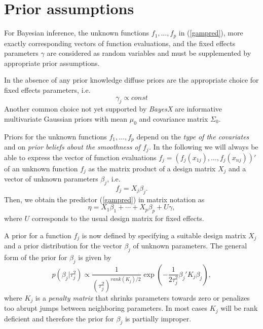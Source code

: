 \documentclass[11pt,a4paper,twoside]{bayesxarticle}
\begin{document}
\section{Prior assumptions}
\label{priorassumptions}

For Bayesian inference, the unknown functions $f_{1},\dots ,f_{p}$
in (\ref{gampred}), more exactly corresponding vectors of function
evaluations, and the fixed effects parameters $\gamma$ are
considered as random variables and must be supplemented by
appropriate prior assumptions.

In the absence of any prior knowledge diffuse priors are the
appropriate choice for fixed effects parameters, i.e.
$$
\gamma_j \propto const
$$
Another common choice not yet supported by {\em BayesX} are
informative multivariate Gaussian priors with mean $\mu_0$ and
covariance matrix $\Sigma_0$.


Priors for the unknown functions $f_{1},\dots,f_{p}$ depend on the
{\em type of the covariates} and on {\em prior beliefs about the
smoothness of $f_j$.} In the following we will always be able to
express the vector of function evaluations
$f_j=(f_j(x_{1j}),\dots,f_j(x_{nj}))'$ of an unknown function
$f_j$ as the matrix product of a design matrix $X_j$ and a vector
of unknown parameters $\beta_j$, i.e.
\begin{equation}
\label{matproduct} f_j=X_j \beta_j.
\end{equation}
Then, we obtain the predictor (\ref{gampred}) in matrix notation
as
\begin{equation}
\label{gampredmatrix} \eta = X_1 \beta_1 + \cdots + X_p \beta_p +
U \gamma,
\end{equation}
where $U$ corresponds to the usual design matrix for fixed
effects.

A prior for a function $f_j$ is now defined by specifying a
suitable design matrix $X_j$ and a prior distribution for the
vector $\beta_j$ of unknown parameters. The general form of the
prior for $\beta_j$ is given by
\begin{equation}
\label{genform} p(\beta_j | \tau_j^2) \propto
\frac{1}{(\tau^2_j)^{rank(K_j)/2}} \exp\left(-\frac{1}{2\tau_j^2}
\beta_j' K_j \beta_j\right),
\end{equation}
where $K_j$ is a {\em penalty matrix} that shrinks parameters
towards zero or penalizes too abrupt jumps between neighboring
parameters. In most cases $K_j$ will be rank deficient and
therefore the prior for $\beta_j$ is partially improper.
\end{document}
